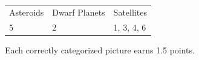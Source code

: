 \begin{center}\begin{tabular}{lll}
Asteroids & Dwarf Planets & Satellites\\
5 & 2 & 1, 3, 4, 6
\end{tabular}\end{center}
Each correctly categorized picture earns 1.5 points.
